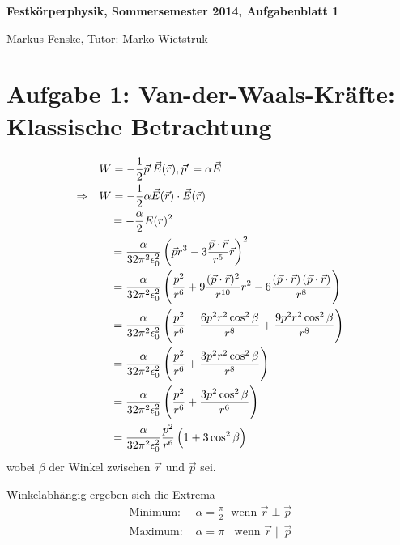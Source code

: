 \documentclass[a4paper,german,12pt,smallheadings]{scrartcl}
\begin{document}
\allowdisplaybreaks %
\begin{center}
\bfseries %
\sffamily %
\vspace{-40pt}
Festkörperphysik, Sommersemester 2014, Aufgabenblatt 1

Markus Fenske, Tutor: Marko Wietstruk
\vspace{-10pt}
\end{center}
\section*{Aufgabe 1: Van-der-Waals-Kräfte: Klassische Betrachtung}
\begin{align}
  &W = -\frac{1}{2} \vec{p}' \vec{E}(\vec{r}), \vec{p}' = \alpha \vec{E} \\
  \Rightarrow \quad &W = - \frac{1}{2} \alpha \vec{E}(\vec{r}) \cdot \vec{E}(\vec{r}) \\
                    &\;\;\;\, = - \frac{\alpha}{2} E(r)^2 \\
  &\;\;\;\,
  = \frac{\alpha}{32 \pi^2 \epsilon_0^2} \del{
    \vec{p}{r^3} - 3 \frac{\vec{p} \cdot \vec{r}}{r^5} \vec{r}
  }^2 \\
  &\;\;\;\,
  = \frac{\alpha}{32 \pi^2 \epsilon_0^2} \del{
    \frac{p^2}{r^6} + 9 \frac{(\vec{p} \cdot \vec{r})^2}{r^{10}} r^2
    - 6 \frac{\del{\vec{p} \cdot \vec{r}} \del{\vec{p} \cdot \vec{r}}}{r^8}
  } \\
  &\;\;\;\,
  = \frac{\alpha}{32 \pi^2 \epsilon_0^2} \del{
    \frac{p^2}{r^6} - \frac{6p^2r^2 \cos^2 \beta}{r^8} + \frac{9 p^2 r^2 \cos^2 \beta}{r^8}
  } \\
  &\;\;\;\,
  = \frac{\alpha}{32 \pi^2 \epsilon_0^2} \del{
    \frac{p^2}{r^6} + \frac{3p^2r^2 \cos^2 \beta}{r^8}
  } \\
  &\;\;\;\,
  = \frac{\alpha}{32 \pi^2 \epsilon_0^2} \del{
    \frac{p^2}{r^6} + \frac{3p^2 \cos^2 \beta}{r^6}
  } \\
  &\;\;\;\,
  = \frac{\alpha}{32 \pi^2 \epsilon_0^2} \frac{p^2}{r^6} \del{
    1 + 3 \cos^2 \beta
  } \\
\end{align}
wobei $\beta$ der Winkel zwischen $\vec{r}$ und $\vec{p}$ sei.

Winkelabhängig ergeben sich die Extrema
\begin{align}
  \text{Minimum: } & \alpha = \frac{\pi}{2} \; \text{ wenn } \vec{r} \perp \vec{p} \\
  \text{Maximum: } & \alpha = \pi \;\; \text{ wenn } \vec{r} \parallel \vec{p} \\
\end{align}
\end{document}
